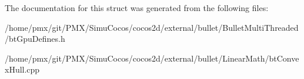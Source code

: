 The documentation for this struct was generated from the following files\+:\begin{DoxyCompactItemize}
\item 
/home/pmx/git/\+P\+M\+X/\+Simu\+Cocos/cocos2d/external/bullet/\+Bullet\+Multi\+Threaded/bt\+Gpu\+Defines.\+h\item 
/home/pmx/git/\+P\+M\+X/\+Simu\+Cocos/cocos2d/external/bullet/\+Linear\+Math/bt\+Convex\+Hull.\+cpp\end{DoxyCompactItemize}
